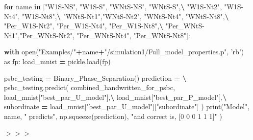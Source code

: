 \documentclass[openany,twoside]{book}
\newenvironment{Shaded}{\begin{snugshade}}{\end{snugshade}}
\newcommand{\BuiltInTok}[1]{#1}
\newcommand{\ControlFlowTok}[1]{\textcolor[rgb]{0.13,0.29,0.53}{\textbf{#1}}}
\newcommand{\ImportTok}[1]{#1}
\newcommand{\KeywordTok}[1]{\textcolor[rgb]{0.13,0.29,0.53}{\textbf{#1}}}
\newcommand{\NormalTok}[1]{#1}
\newcommand{\OperatorTok}[1]{\textcolor[rgb]{0.81,0.36,0.00}{\textbf{#1}}}
\newcommand{\StringTok}[1]{\textcolor[rgb]{0.31,0.60,0.02}{#1}}
\begin{document}
\begin{Shaded}
\begin{Highlighting}[]
\ControlFlowTok{for}\NormalTok{ name }\KeywordTok{in}\NormalTok{ [}\StringTok{"W1S-NS"}\NormalTok{, }\StringTok{"W1S-S"}\NormalTok{, }\StringTok{"WNtS-NS"}\NormalTok{, }\StringTok{"WNtS-S"}\NormalTok{,}\OperatorTok{\textbackslash{}}
            \StringTok{"W1S-Nt2"}\NormalTok{, }\StringTok{"W1S-Nt4"}\NormalTok{, }\StringTok{"W1S-Nt8"}\NormalTok{,}\OperatorTok{\textbackslash{}}
             \StringTok{"WNtS-Nt1"}\NormalTok{,}\StringTok{"WNtS-Nt2"}\NormalTok{, }\StringTok{"WNtS-Nt4"}\NormalTok{, }\StringTok{"WNtS-Nt8"}\NormalTok{,}\OperatorTok{\textbackslash{}}
             \StringTok{"Per_W1S-Nt2"}\NormalTok{, }\StringTok{"Per_W1S-Nt4"}\NormalTok{, }\StringTok{"Per_W1S-Nt8"}\NormalTok{,}\OperatorTok{\textbackslash{}}
             \StringTok{"Per_WNtS-Nt1"}\NormalTok{,}\StringTok{"Per_WNtS-Nt2"}\NormalTok{, }\StringTok{"Per_WNtS-Nt4"}\NormalTok{, }\StringTok{"Per_WNtS-Nt8"}\NormalTok{]:}
            
    \ControlFlowTok{with} \BuiltInTok{open}\NormalTok{(}\StringTok{"Examples/"}\OperatorTok{+}\NormalTok{name}\OperatorTok{+}\StringTok{"/simulation1/Full_model_properties.p"}\NormalTok{, }\StringTok{'rb'}\NormalTok{) }\ImportTok{as}\NormalTok{ fp:}
\NormalTok{        load_mnist }\OperatorTok{=}\NormalTok{ pickle.load(fp)}
    
\NormalTok{    psbc_testing }\OperatorTok{=}\NormalTok{ Binary_Phase_Separation()}
\NormalTok{    prediction }\OperatorTok{=} \OperatorTok{\textbackslash{}}
\NormalTok{    psbc_testing.predict(}
\NormalTok{        combined_handwritten_for_psbc,  load_mnist[}\StringTok{"best_par_U_model"}\NormalTok{],}\OperatorTok{\textbackslash{}} 
\NormalTok{			load_mnist[}\StringTok{"best_par_P_model"}\NormalTok{],}\OperatorTok{\textbackslash{}}
\NormalTok{        subordinate }\OperatorTok{=}\NormalTok{ load_mnist[}\StringTok{"best_par_U_model"}\NormalTok{][}\StringTok{"subordinate"}\NormalTok{]}
\NormalTok{    )}
    \BuiltInTok{print}\NormalTok{(}\StringTok{"Model"}\NormalTok{, name, }\StringTok{" predicts"}\NormalTok{, np.squeeze(prediction), }\StringTok{"and correct is, [0 0 0 1 1 1]"}\NormalTok{ )}
\end{Highlighting}
\end{Shaded}

\(>>>\)
\end{document}

